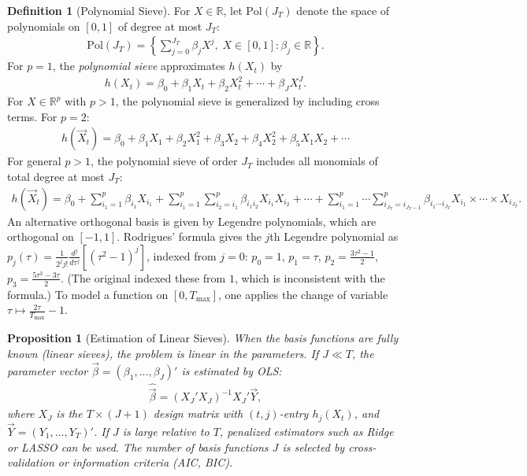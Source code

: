 \documentclass[11pt]{article}
\theoremstyle{definition}
\newtheorem{definition}{Definition}[section]
\theoremstyle{plain}
\newtheorem{proposition}{Proposition}[section]
\theoremstyle{remark}
\begin{document}
\begin{definition}[Polynomial Sieve]
    For $X \in \mathbb{R}$, let $\mathrm{Pol}(J_T)$ denote the space of polynomials on $[0,1]$ of degree at most $J_T$:
    \begin{align}
        \mathrm{Pol}(J_T) = \left\{ \sum_{j=0}^{J_T} \beta_j X^j,\; X \in [0,1] : \beta_j \in \mathbb{R} \right\}.
    \end{align}
    For $p = 1$, the \textit{polynomial sieve} approximates $h(X_t)$ by
    \begin{align}
        h(X_t) = \beta_0 + \beta_1 X_t + \beta_2 X_t^2 + \cdots + \beta_J X_t^J.
    \end{align}
    For $X \in \mathbb{R}^p$ with $p > 1$, the polynomial sieve is generalized by including cross terms. For $p = 2$:
    \begin{align}
        h(\vec{X}_t) = \beta_0 + \beta_1 X_1 + \beta_2 X_1^2 + \beta_3 X_2 + \beta_4 X_2^2 + \beta_5 X_1 X_2 + \cdots
    \end{align}
    For general $p > 1$, the polynomial sieve of order $J_T$ includes all monomials of total degree at most $J_T$:
    \begin{align}
        h(\vec{X}_t) = \beta_0 + \sum_{i_1=1}^{p}\beta_{i_1}X_{i_1} + \sum_{i_1=1}^{p}\sum_{i_2=i_1}^{p}\beta_{i_1 i_2}X_{i_1}X_{i_2} + \cdots + \sum_{i_1=1}^{p}\cdots\sum_{i_{J_T}=i_{J_T-1}}^{p}\beta_{i_1\cdots i_{J_T}}X_{i_1}\times\cdots\times X_{i_{J_T}}.
    \end{align}
    An alternative orthogonal basis is given by Legendre polynomials, which are orthogonal on $[-1,1]$. Rodrigues' formula gives the $j$th Legendre polynomial as $p_j(\tau) = \frac{1}{2^j j!}\frac{d^j}{d\tau^j}[(\tau^2-1)^j]$, indexed from $j=0$: $p_0 = 1$, $p_1 = \tau$, $p_2 = \frac{3\tau^2 - 1}{2}$, $p_3 = \frac{5\tau^3-3\tau}{2}$. (The original indexed these from $1$, which is inconsistent with the formula.) To model a function on $[0, T_{\max}]$, one applies the change of variable $\tau \mapsto \frac{2\tau}{T_{\max}} - 1$.
\end{definition}

\begin{proposition}[Estimation of Linear Sieves]
    When the basis functions are fully known (linear sieves), the problem is linear in the parameters. If $J \ll T$, the parameter vector $\vec{\beta} = (\beta_1, \ldots, \beta_J)'$ is estimated by OLS:
    \begin{align}
        \hat{\vec{\beta}} = \left(X_J' X_J\right)^{-1} X_J' \vec{Y},
    \end{align}
    where $X_J$ is the $T \times (J+1)$ design matrix with $(t,j)$-entry $h_j(X_t)$, and $\vec{Y} = (Y_1, \ldots, Y_T)'$. If $J$ is large relative to $T$, penalized estimators such as Ridge or LASSO can be used. The number of basis functions $J$ is selected by cross-validation or information criteria (AIC, BIC).
\end{proposition}
\end{document}
